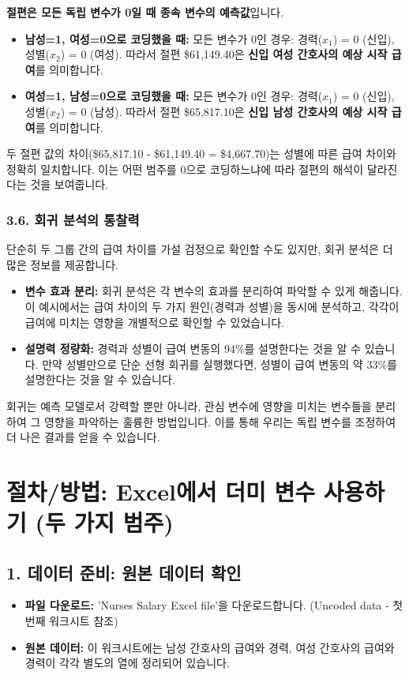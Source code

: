 \documentclass[11pt,a4paper]{article}
\theoremstyle{definition}
\begin{document}
\begin{tcolorbox}[title=절편(Intercept)의 의미 변화]
\textbf{절편은 모든 독립 변수가 0일 때 종속 변수의 예측값}입니다.
\begin{itemize}
    \item \textbf{남성=1, 여성=0으로 코딩했을 때:}
    모든 변수가 0인 경우: 경력($x_1$) = 0 (신입), 성별($x_2$) = 0 (여성).
    따라서 절편 \$61,149.40은 \textbf{신입 여성 간호사의 예상 시작 급여}를 의미합니다.
    \item \textbf{여성=1, 남성=0으로 코딩했을 때:}
    모든 변수가 0인 경우: 경력($x_1$) = 0 (신입), 성별($x_2$) = 0 (남성).
    따라서 절편 \$65,817.10은 \textbf{신입 남성 간호사의 예상 시작 급여}를 의미합니다.
\end{itemize}
두 절편 값의 차이(\$65,817.10 - \$61,149.40 = \$4,667.70)는 성별에 따른 급여 차이와 정확히 일치합니다. 이는 어떤 범주를 0으로 코딩하느냐에 따라 절편의 해석이 달라진다는 것을 보여줍니다.
\end{tcolorbox}

\subsubsection*{3.6. 회귀 분석의 통찰력}
단순히 두 그룹 간의 급여 차이를 가설 검정으로 확인할 수도 있지만, 회귀 분석은 더 많은 정보를 제공합니다.
\begin{itemize}
    \item \textbf{변수 효과 분리:} 회귀 분석은 각 변수의 효과를 분리하여 파악할 수 있게 해줍니다. 이 예시에서는 급여 차이의 두 가지 원인(경력과 성별)을 동시에 분석하고, 각각이 급여에 미치는 영향을 개별적으로 확인할 수 있었습니다.
    \item \textbf{설명력 정량화:} 경력과 성별이 급여 변동의 94\%를 설명한다는 것을 알 수 있습니다. 만약 성별만으로 단순 선형 회귀를 실행했다면, 성별이 급여 변동의 약 33\%를 설명한다는 것을 알 수 있습니다.
\end{itemize}
회귀는 예측 모델로서 강력할 뿐만 아니라, 관심 변수에 영향을 미치는 변수들을 분리하여 그 영향을 파악하는 훌륭한 방법입니다. 이를 통해 우리는 독립 변수를 조정하여 더 나은 결과를 얻을 수 있습니다.

\newpage
\section{절차/방법: Excel에서 더미 변수 사용하기 (두 가지 범주)}

\subsection{1. 데이터 준비: 원본 데이터 확인}
\begin{itemize}
    \item \textbf{파일 다운로드:} 'Nurses Salary Excel file'을 다운로드합니다. (Uncoded data - 첫 번째 워크시트 참조)
    \item \textbf{원본 데이터:} 이 워크시트에는 남성 간호사의 급여와 경력, 여성 간호사의 급여와 경력이 각각 별도의 열에 정리되어 있습니다.
\end{itemize}
\end{document}
